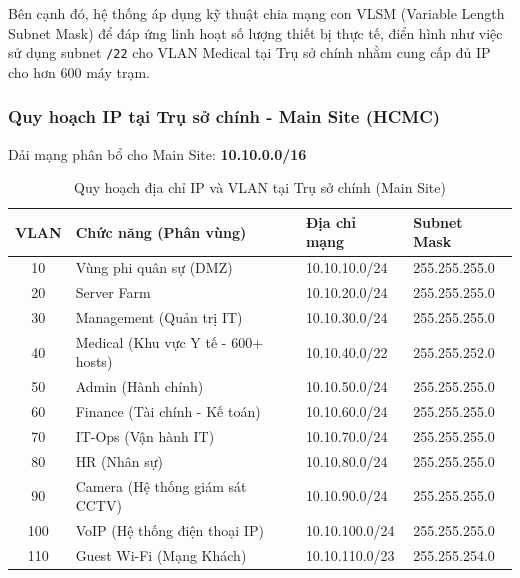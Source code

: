 Bên cạnh đó, hệ thống áp dụng kỹ thuật chia mạng con VLSM (Variable Length Subnet Mask) để đáp ứng linh hoạt số lượng thiết bị thực tế, điển hình như việc sử dụng subnet \texttt{/22} cho VLAN Medical tại Trụ sở chính nhằm cung cấp đủ IP cho hơn 600 máy trạm.

\subsubsection{Quy hoạch IP tại Trụ sở chính - Main Site (HCMC)}
Dải mạng phân bổ cho Main Site: \textbf{10.10.0.0/16}

{
    \small %
    \renewcommand{\arraystretch}{1.3}
    \begin{longtable}{|c|>{\raggedright\arraybackslash}p{6cm}|l|l|}
        \caption{Quy hoạch địa chỉ IP và VLAN tại Trụ sở chính (Main Site)}
        \label{tab:ip_main} \\
        \hline
        \textbf{VLAN} & \textbf{Chức năng (Phân vùng)} & \textbf{Địa chỉ mạng} & \textbf{Subnet Mask} \\
        \hline
        \endfirsthead
        
        \endhead

        \endfoot

        \hline
        \endlastfoot

        10 & Vùng phi quân sự (DMZ) & 10.10.10.0/24 & 255.255.255.0 \\
        \hline
        20 & Server Farm & 10.10.20.0/24 & 255.255.255.0 \\
        \hline
        30 & Management (Quản trị IT) & 10.10.30.0/24 & 255.255.255.0 \\
        \hline
        40 & Medical (Khu vực Y tế - 600+ hosts) & 10.10.40.0/22 & 255.255.252.0 \\
        \hline
        50 & Admin (Hành chính) & 10.10.50.0/24 & 255.255.255.0 \\
        \hline
        60 & Finance (Tài chính - Kế toán) & 10.10.60.0/24 & 255.255.255.0 \\
        \hline
        70 & IT-Ops (Vận hành IT) & 10.10.70.0/24 & 255.255.255.0 \\
        \hline
        80 & HR (Nhân sự) & 10.10.80.0/24 & 255.255.255.0 \\
        \hline
        90 & Camera (Hệ thống giám sát CCTV) & 10.10.90.0/24 & 255.255.255.0 \\
        \hline
        100 & VoIP (Hệ thống điện thoại IP) & 10.10.100.0/24 & 255.255.255.0 \\
        \hline
        110 & Guest Wi-Fi (Mạng Khách) & 10.10.110.0/23 & 255.255.254.0 \\
    \end{longtable}
}
